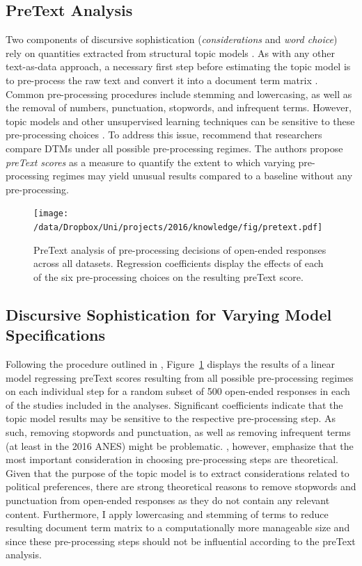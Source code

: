\subsection{PreText Analysis}\label{app:topicmodel}
Two components of discursive sophistication (\textit{considerations} and \textit{word choice}) rely on quantities extracted from structural topic models \citep{roberts2014structural}. As with any other text-as-data approach, a necessary first step before estimating the topic model is to pre-process the raw text and convert it into a document term matrix \citep[DTM, see for example][]{manning2008introduction}. Common pre-processing procedures include stemming and lowercasing, as well as the removal of numbers, punctuation, stopwords, and infrequent terms. However, topic models and other unsupervised learning techniques can be sensitive to these pre-processing choices \citep[c.f.,][]{denny2018text}. To address this issue, \citet{denny2018text} recommend that researchers compare DTMs under all possible pre-processing regimes. The authors propose \textit{preText scores} as a measure to quantify the extent to which varying pre-processing regimes may yield unusual results compared to a baseline without any pre-processing.

\begin{figure}[h]
\centering\texttt{[image: /data/Dropbox/Uni/projects/2016/knowledge/fig/pretext.pdf]}
    \caption[PreText analysis of pre-processing decisions of open-ended responses across all datasets]{PreText analysis of pre-processing decisions of open-ended responses across all datasets. Regression coefficients display the effects of each of the six pre-processing choices on the resulting preText score.}\label{fig:pretext}
\end{figure}

\clearpage
\subsection{Discursive Sophistication for Varying Model Specifications}

Following the procedure outlined in \citet{denny2018text}, Figure~\ref{fig:pretext} displays the results of a linear model regressing preText scores resulting from all possible pre-processing regimes on each individual step for a random subset of 500 open-ended responses in each of the studies included in the analyses. Significant coefficients indicate that the topic model results may be sensitive to the respective pre-processing step. As such, removing stopwords and punctuation, as well as removing infrequent terms (at least in the 2016 ANES) might be problematic. \citet{denny2018text}, however, emphasize that the most important consideration in choosing pre-processing steps are theoretical. Given that the purpose of the topic model is to extract considerations related to political preferences, there are strong theoretical reasons to remove stopwords and punctuation from open-ended responses as they do not contain any relevant content. Furthermore, I apply lowercasing and stemming of terms to reduce resulting document term matrix to a computationally more manageable size and since these pre-processing steps should not be influential according to the preText analysis.

